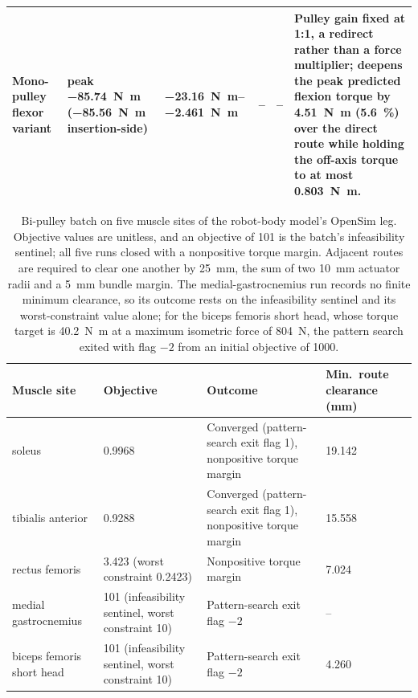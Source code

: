 \begin{table}[htbp]
\begin{tabular}{@{}p{2.3cm}p{2.7cm}p{2.4cm}p{1.4cm}p{1.1cm}p{4.4cm}@{}}
Mono-pulley flexor variant & peak \qty{-85.74}{\newton\meter} (\qty{-85.56}{\newton\meter} insertion-side) & \qtyrange{-23.16}{-2.461}{\newton\meter} & -- & -- & Pulley gain fixed at 1:1, a redirect rather than a force multiplier; deepens the peak predicted flexion torque by \qty{4.51}{\newton\meter} (\qty{5.6}{\percent}) over the direct route while holding the off-axis torque to at most \qty{0.803}{\newton\meter}. \\
\bottomrule
\end{tabular}
\end{table}

\begin{table}[htbp]
\caption{Bi-pulley batch on five muscle sites of the robot-body model's OpenSim leg. Objective values are unitless, and an objective of \num{101} is the batch's infeasibility sentinel; all five runs closed with a nonpositive torque margin. Adjacent routes are required to clear one another by \qty{25}{\mm}, the sum of two \qty{10}{\mm} actuator radii and a \qty{5}{\mm} bundle margin. The medial-gastrocnemius run records no finite minimum clearance, so its outcome rests on the infeasibility sentinel and its worst-constraint value alone; for the biceps femoris short head, whose torque target is \qty{40.2}{\newton\meter} at a maximum isometric force of \qty{804}{\N}, the pattern search exited with flag $-2$ from an initial objective of \num{1000}.}
\label{tab:BiPulley}
\small
\begin{tabular}{@{}lp{2.4cm}p{5.9cm}p{2.6cm}@{}}
\toprule
\textbf{Muscle site} & \textbf{Objective} & \textbf{Outcome} & \textbf{Min.\ route clearance (\unit{\milli\meter})} \\
\midrule
soleus & \num{0.9968} & Converged (pattern-search exit flag 1), nonpositive torque margin & 19.142 \\
tibialis anterior & \num{0.9288} & Converged (pattern-search exit flag 1), nonpositive torque margin & 15.558 \\
rectus femoris & \num{3.423} (worst constraint \num{0.2423}) & Nonpositive torque margin & 7.024 \\
medial gastrocnemius & \num{101} (infeasibility sentinel, worst constraint \num{10}) & Pattern-search exit flag $-2$ & -- \\
biceps femoris short head & \num{101} (infeasibility sentinel, worst constraint \num{10}) & Pattern-search exit flag $-2$ & 4.260 \\
\bottomrule
\end{tabular}
\end{table}

